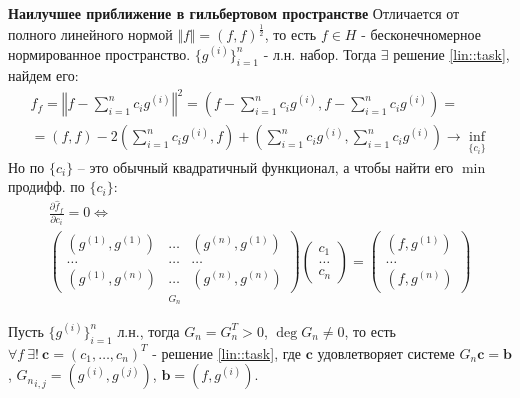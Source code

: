 \begin{ticket}
  \textbf{Наилучшее приближение в гильбертовом пространстве}
  Отличается от полного линейного нормой $\Vert f\Vert=(f,f)^{\frac{1}{2}}$,
  то есть $f\in H$ - бесконечномерное нормированное пространство.
  $\{g^{(i)}\}^n_{i=1}$ - л.н. набор. Тогда
  $\exists$ решение \eqref{lin::task}, найдем его:
  \begin{multline*}
    \hat{f}_f=\left\Vert f-\sum_{i=1}^nc_ig^{(i)}\right\Vert^2 = \left(f-\sum_{i=1}^nc_ig^{(i)}, f-\sum_{i=1}^nc_ig^{(i)}\right)= \\
    = (f,f)-2\left(\sum_{i=1}^nc_ig^{(i)}, f\right)+\left(\sum_{i=1}^nc_ig^{(i)}, \sum_{i=1}^nc_ig^{(i)}\right)\rightarrow\inf_{\{c_i\}}
  \end{multline*}
  Но по $\{c_i\}$ -- это обычный квадратичный функционал, а чтобы найти его $\min$ продифф. по $\{c_i\}$:
  \begin{multline*}
    \frac{\partial \hat{f}_f}{\partial c_i} = 0\Leftrightarrow  \\
    \underset{G_n}{\begin{pmatrix}
        (g^{(1)},g^{(1)}) & \ldots & (g^{(n)},g^{(1)}) \\
        \ldots            & \ldots & \ldots            \\
        (g^{(1)},g^{(n)}) & \ldots & (g^{(n)},g^{(n)})
      \end{pmatrix}}
    \begin{pmatrix}
      c_1    \\
      \ldots \\
      c_n
    \end{pmatrix} =
    \begin{pmatrix}
      (f,g^{(1)}) \\
      \ldots      \\
      (f,g^{(n)})
    \end{pmatrix}
  \end{multline*}
  \begin{theorem}
    Пусть $\{g^{(i)}\}_{i=1}^n$ л.н., тогда $G_n=G_n^T>0$, $\deg G_n\neq0$,
    то есть $\forall f\ \exists!\ \mathbf{c}=(c_1,\ldots,c_n)^T$ - решение \eqref{lin::task},
    где $\mathbf{c}$ удовлетворяет системе $G_n\mathbf{c}=\mathbf{b}$,
    ${G_n}_{i,j}=(g^{(i)},g^{(j)})$, $\mathbf{b}=(f,g^{(i)})$.
  \end{theorem}
\end{ticket}
